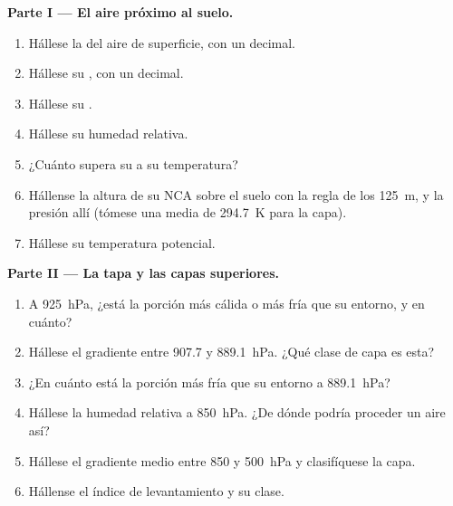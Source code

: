 \begin{problem}
\medskip\noindent\textbf{Parte I --- El aire próximo al suelo.}
\begin{enumerate}
  \item Hállese la  del aire de superficie, con un decimal.
  \item Hállese su , con un decimal.
  \item Hállese su .
  \item Hállese su humedad relativa.
  \item ¿Cuánto supera su  a su temperatura?
  \item Hállense la altura de su NCA sobre el suelo con la regla de los \qty{125}{m}, y la presión
        allí (tómese una  media de \qty{294.7}{K} para la capa).
  \item Hállese su temperatura potencial.
\end{enumerate}

\medskip\noindent\textbf{Parte II --- La tapa y las capas superiores.}
\begin{enumerate}[resume]
  \item A \qty{925}{hPa}, ¿está la porción más cálida o más fría que su entorno, y en cuánto?
  \item Hállese el gradiente entre 907.7 y \qty{889.1}{hPa}. ¿Qué clase de capa es esta?
  \item ¿En cuánto está la porción más fría que su entorno a \qty{889.1}{hPa}?
  \item Hállese la humedad relativa a \qty{850}{hPa}. ¿De dónde podría proceder un aire así?
  \item Hállese el gradiente medio entre 850 y \qty{500}{hPa} y clasifíquese la capa.
  \item Hállense el índice de levantamiento y su clase.
\end{enumerate}


\end{problem}
